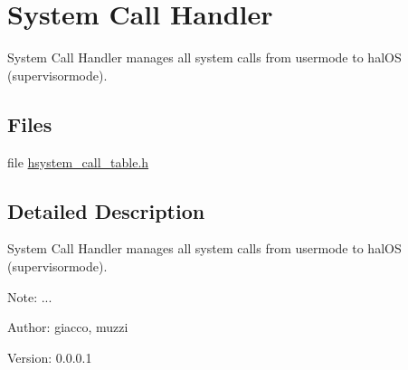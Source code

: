 \hypertarget{group___s_y_s_t_e_m___c_a_l_l___h_a_n_d_l_e_r}{
\section{System Call Handler}
\label{group___s_y_s_t_e_m___c_a_l_l___h_a_n_d_l_e_r}
}
System Call Handler manages all system calls from usermode to halOS (supervisormode).  


\subsection*{Files}
\begin{CompactItemize}
\item 
file \hyperlink{hsystem__call__table_8h}{hsystem\_\-call\_\-table.h}
\end{CompactItemize}


\subsection{Detailed Description}
System Call Handler manages all system calls from usermode to halOS (supervisormode). 

\begin{Desc}
\item[Note:]... \end{Desc}
\begin{Desc}
\item[Author:]giacco, muzzi \end{Desc}
\begin{Desc}
\item[Version:]0.0.0.1 \end{Desc}
